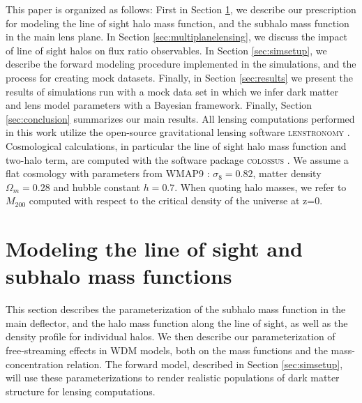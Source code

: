 This paper is organized as follows: First in Section \ref{sec:rendering}, we describe our prescription for modeling the line of sight halo mass function, and the subhalo mass function in the main lens plane. In Section \ref{sec:multiplanelensing}, we discuss the impact of line of sight halos on flux ratio observables. In Section \ref{sec:simsetup}, we describe the forward modeling procedure implemented in the simulations, and the process for creating mock datasets. Finally, in Section \ref{sec:results} we present the results of simulations run with a mock data set in which we infer dark matter and lens model parameters with a Bayesian framework. Finally, Section \ref{sec:conclusion} summarizes our main results. All lensing computations performed in this work utilize the open-source gravitational lensing software {\textsc{lenstronomy}} \citep{Birrer++15,BirrerAmara18}. Cosmological calculations, in particular the line of sight halo mass function and two-halo term, are computed with the software package {\textsc{colossus}} \citep{Diemer17}. We assume a flat cosmology with parameters from WMAP9 \citep{WMAP9cosmo}: $\sigma_8 = 0.82$, matter density $\Omega_{m} = 0.28$ and hubble constant $h = 0.7$. When quoting halo masses, we refer to $M_{200}$ computed with respect to the critical density of the universe at z=0.

\section{Modeling the  line of sight and subhalo mass functions}
\label{sec:rendering}

This section describes the parameterization of the subhalo mass function in the main deflector, and the halo mass function along the line of sight, as well as the density profile for individual halos. We then describe our parameterization of free-streaming effects in WDM models, both on the mass functions and the mass-concentration relation. The forward model, described in Section \ref{sec:simsetup}, will use these parameterizations to render realistic populations of dark matter structure for lensing computations.

